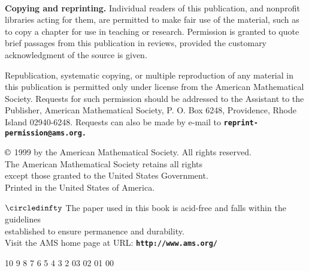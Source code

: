 \begin{copyrightpage}
\hrulefill\\

\textbf{Copying and reprinting.} Individual readers of this
publication, and nonprofit libraries acting for them, are permitted
to make fair use of the material, such as to copy a chapter for use
in teaching or research. Permission is granted to quote brief
passages from this publication in reviews, provided the customary
acknowledgment of the source is given.

Republication, systematic copying, or multiple reproduction of any material in this publication is permitted only under license from the American Mathematical Society. Requests for such permission should be addressed to the Assistant to the Publisher, American Mathematical Society, P. O. Box 6248, Providence, Rhode Island 02940-6248. Requests can also be made by e-mail to \textbf{\texttt{reprint-permission@ams.org.}}\\

\begin{center}
$\copyright$ 1999 by the American Mathematical Society. All rights reserved.\\
The American Mathematical Society retains all rights\\
except those granted to the United States Government.\\
Printed in the United States of America.
\end{center}

\begin{center}
$\circledinfty$ The paper used in this book is acid-free and falls within the guidelines\\
established to ensure permanence and durability.\\
Visit the AMS home page at URL:
\textbf{\texttt{http://www.ams.org/}}
\end{center}

\begin{center}
10 9 8 7 6 5 4 3 2  03 02 01 00
\end{center}
\end{copyrightpage}
